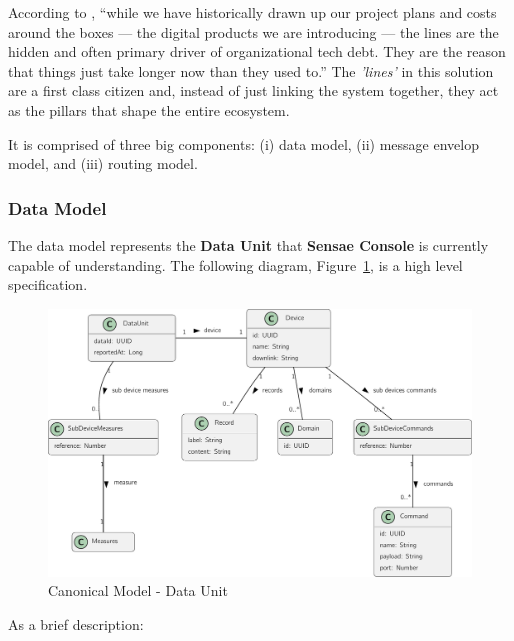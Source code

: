 According to \cite{integration}, ``while we have historically drawn up our project plans and costs around the boxes — the digital products we are introducing — the lines are the hidden and often primary driver of organizational tech debt. They are the reason that things just take longer now than they used to.'' The \textit{'lines'} in this solution are a first class citizen and, instead of just linking the system together, they act as the pillars that shape the entire ecosystem.

It is comprised of three big components: (i) data model, (ii) message envelop model, and (iii) routing model.

\subsubsection{Data Model}
\label{subsubsec:design:domain:shared_model:data}

The data model represents the \textbf{Data Unit} that \textbf{Sensae Console} is currently capable of understanding. The following diagram, Figure~\ref{fig:design:domain:shared_model:data:diagram}, is a high level specification.

\begin{figure}[H]
   \centering
   \includegraphics[page=1,width=\columnwidth]{assets/diagrams/design/domain/shared-model.pdf}
  \caption[Canonical Model - Data Unit]{Canonical Model - Data Unit}
  \label{fig:design:domain:shared_model:data:diagram}
\end{figure}

As a brief description:

